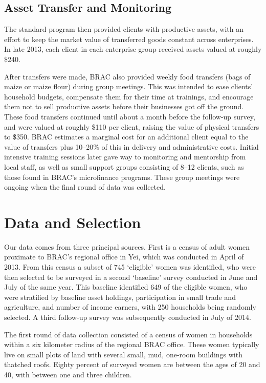 \documentclass[11pt]{article}
\begin{document}
\subsection*{Asset Transfer and Monitoring}
\label{sec-2-3}

The standard program then provided clients with productive assets,
with an effort to keep the market value of transferred goods constant
across enterprises. In late 2013, each client in each enterprise group
received assets valued at roughly \$240.

After transfers were made, BRAC also provided weekly food transfers
(bags of maize or maize flour) during group meetings. This was
intended to ease clients' household budgets, compensate them for
their time at trainings, and encourage them not to sell productive
assets before their businesses got off the ground. These food
transfers continued until about a month before the follow-up survey, and were
valued at roughly \$110 per client, raising the value 
of physical transfers to \$350.  BRAC estimates a marginal cost for
an additional client equal to the value of transfers plus 10--20\% of
this in delivery and administrative costs.  Initial intensive
training sessions later gave way to monitoring and mentorship from
local staff, as well as small support groups consisting of 8--12
clients, such as those found in BRAC's microfinance programs. These group meetings
were ongoing when the final round of data was collected.

\section*{Data and Selection}
\label{sec-3}

Our data comes from three principal sources.  First is a census of adult women
proximate to BRAC's regional office in Yei, which was conducted in April of 2013.
From this census a subset of 745 `eligible' women was identified, who were then
selected to be surveyed in a second `baseline' survey conducted in June and July of
the same year. This baseline identified 649 of the eligible women, who were
stratified by baseline asset holdings, participation in 
small trade and agriculture, and number of income earners, with 250 households
being randomly selected. A third follow-up survey was subsequently conducted in
July of 2014.

The first round of data collection consisted of a census of women in
households within a six kilometer radius of the regional BRAC
office.  These women typically live on small plots of land with
several small, mud, one-room buildings with thatched roofs.  Eighty
percent of surveyed women are between the ages of 20 and 40, with
between one and three children.
\end{document}

